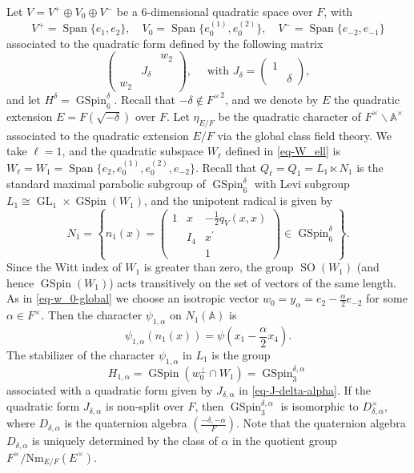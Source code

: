 \documentclass[12pt]{amsart}
\newcommand{\A}{\mathbb{A}}
\newcommand{\Span}{\operatorname{Span}}
\theoremstyle{remark}
\DeclareMathOperator{\GL}{GL}
\DeclareMathOperator{\SO}{SO}
\DeclareMathOperator{\GSpin}{GSpin}
\begin{document}
Let $V=V^+\oplus V_0 \oplus V^-$ be a 6-dimensional quadratic space over $F$, with 
\begin{equation*}
V^+=\Span\{e_1, e_2\}, \quad V_0=\Span\{e_0^{(1)}, e_0^{(2)}\}, \quad 	V^-=\Span\{e_{-2}, e_{-1}\}
\end{equation*}
associated to the quadratic form defined by the following matrix
\begin{equation*}
\begin{pmatrix} 
&&w_2\\
&J_\delta &\\
w_2&&	
\end{pmatrix}, \quad \text{ with } J_{\delta}=\begin{pmatrix} 1&\\ & \delta \end{pmatrix},
\end{equation*}
and let $H^\delta=\GSpin_6^\delta$. Recall that $-\delta\not\in {F^\times}^2$, and we denote by $E$ the quadratic extension $E=F(\sqrt{-\delta})$ over $F$. Let $\eta_{E/F}$ be the quadratic character of $F^\times\backslash \A^\times$ associated to the quadratic extension $E/F$ via the global class field theory.  We take $\ell=1$, and the quadratic subspace $W_\ell$ defined in \eqref{eq-W_ell} is $W_{\ell}=W_1=\Span\{e_2, e_0^{(1)}, e_0^{(2)}, e_{-2}\}$. Recall that $Q_\ell=Q_1=L_1\ltimes N_1$ is the standard maximal parabolic subgroup of $\GSpin_6^\delta$ with Levi subgroup $L_1\cong \GL_1\times \GSpin(W_1)$, and the unipotent radical is given by
\begin{equation}
\label{eq-unipotent-N1}
N_{1} = 	\left\{ n_1(x)=\begin{pmatrix} 1 & x &-\frac{1}{2}q_V(x,x)\\ &I_{4} &x^\prime\\ &&1\end{pmatrix}\in \GSpin_6^\delta \right\}.
\end{equation}
Since the Witt index of $W_1$ is greater than zero, the group $\SO(W_1)$ (and hence $\GSpin(W_1)$) acts transitively on the set of vectors of the same length. As in \eqref{eq-w_0-global}
we choose an isotropic vector $w_0=y_{\alpha}=e_2-\frac{\alpha}{2}e_{-2}$ for some $\alpha\in F^\times$. Then the character $\psi_{1,\alpha}$ on $N_1(\A)$ is 
\begin{equation*}
\psi_{1,\alpha}(n_1(x))=\psi(x_1-\frac{\alpha}{2}x_4). 	
\end{equation*}
The stabilizer of the character $\psi_{1,\alpha}$ in $L_1$ is the group 
\begin{equation*}
H_{1,\alpha}=\GSpin(w_0^\perp \cap W_1)=\GSpin_{3}^{\delta,\alpha}
\end{equation*}
associated with a quadratic form given by $J_{\delta,\alpha}$ in \eqref{eq-J-delta-alpha}. 
If the quadratic form $J_{\delta,\alpha}$ is non-split over $F$, then $\GSpin_{3}^{\delta,\alpha}$ is isomorphic to $D_{\delta,\alpha}^\times$, where $D_{\delta,\alpha}$ is the quaternion algebra $\left( \frac{-\delta,-\alpha}{F}\right)$. 
Note that the quaternion algebra $D_{\delta,\alpha}$ is uniquely determined by the class of $\alpha$ in the quotient group $F^\times/ \mathrm{Nm}_{E/F} (E^\times)$.
\end{document}
